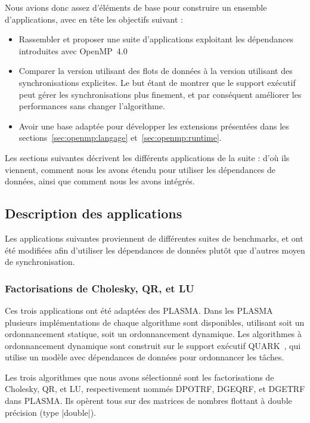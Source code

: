 Nous avions donc assez d'éléments de base pour construire un ensemble d'applications, avec en tête les objectifs suivant :
\begin{itemize}
  \item Rassembler et proposer une suite d'applications exploitant les dépendances introduites avec OpenMP~4.0
  \item Comparer la version utilisant des flots de données à la version utilisant des synchronisations explicites. Le but étant de montrer que le support exécutif peut gérer les synchronisations plus finement, et par conséquent améliorer les performances sans changer l'algorithme.
  \item Avoir une base adaptée pour développer les extensions présentées dans les sections~\ref{sec:openmp:langage} et~\ref{sec:openmp:runtime}.
\end{itemize}

Les sections suivantes décrivent les différents applications de la suite : d'où ils viennent, comment nous les avons étendu pour utiliser les dépendances de données, ainsi que comment nous les avons intégrés.


\subsection{Description des applications}

Les applications suivantes proviennent de différentes suites de benchmarks, et ont été modifiées afin d'utiliser les dépendances de données plutôt que d'autres moyen de synchronisation.

\subsubsection{Factorisations de Cholesky, QR, et LU}

Ces trois applications ont été adaptées des PLASMA.
Dans les PLASMA plusieurs implémentations de chaque algorithme sont disponibles, utilisant soit un ordonnancement statique, soit un ordonnancement dynamique.
Les algorithmes à ordonnancement dynamique sont construit sur le support exécutif QUARK~\cite{YarKhan2011}, qui utilise un modèle avec dépendances de données pour ordonnancer les tâches.

Les trois algorithmes que nous avons sélectionné sont les factorisations de Cholesky, QR, et LU, respectivement nommés DPOTRF, DGEQRF, et DGETRF dans PLASMA.
Ils opèrent tous sur des matrices de nombres flottant à double précision (type |double|).

